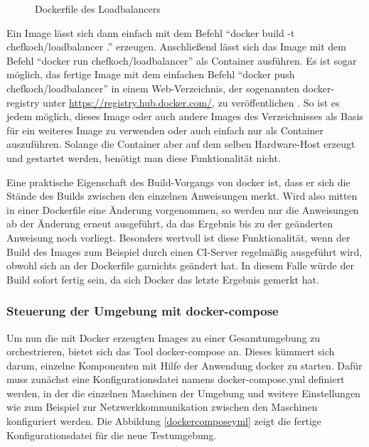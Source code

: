 \begin{figure}[!ht]
  \begin{center}
    \caption{Dockerfile des Loadbalancers}
    \label{loadbalancer-dockerfile}
  \end{center}
\end{figure}

Ein Image lässt sich dann einfach mit dem Befehl "`docker build -t chefkoch/loadbalancer ."' erzeugen. Anschließend lässt sich das Image mit dem Befehl "`docker run chefkoch/loadbalancer"' als Container ausführen. Es ist sogar möglich, das fertige Image mit dem einfachen Befehl "`docker push chefkoch/loadbalancer"' in einem Web-Verzeichnis, der sogenannten docker-registry unter \href{https://registry.hub.docker.com/}{https://registry.hub.docker.com/}, zu veröffentlichen \citep[Vgl][]{docker:004}. So ist es jedem möglich, dieses Image oder auch andere Images des Verzeichnisses als Basis für ein weiteres Image zu verwenden oder auch einfach nur als Container auszuführen. Solange die Container aber auf dem selben Hardware-Host erzeugt und gestartet werden, benötigt man diese Funktionalität nicht.

Eine praktische Eigenschaft des Build-Vorgangs von docker ist, dass er sich die Stände des Builds zwischen den einzelnen Anweisungen merkt. Wird also mitten in einer Dockerfile eine Änderung vorgenommen, so werden nur die Anweisungen ab der Änderung erneut ausgeführt, da das Ergebnis bis zu der geänderten Anweisung noch vorliegt. Besonders wertvoll ist diese Funktionalität, wenn der Build des Images zum Beispiel durch einen CI-Server regelmäßig ausgeführt wird, obwohl sich an der Dockerfile garnichts geändert hat. In diesem Falle würde der Build sofort fertig sein, da sich Docker das letzte Ergebnis gemerkt hat.

\subsubsection{Steuerung der Umgebung mit docker-compose}

Um nun die mit Docker erzeugten Images zu einer Gesamtumgebung zu orchestrieren, bietet sich das Tool docker-compose \citep[Vgl.][]{dockercompose} an. Dieses kümmert sich darum, einzelne Komponenten mit Hilfe der Anwendung docker zu starten. Dafür muss zunächst eine Konfigurationsdatei namens docker-compose.yml definiert werden, in der die einzelnen Maschinen der Umgebung und weitere Einstellungen wie zum Beispiel zur Netzwerkkommunikation zwischen den Maschinen konfiguriert werden. Die Abbildung \ref{dockercomposeyml} zeigt die fertige Konfigurationsdatei für die neue Testumgebung.

